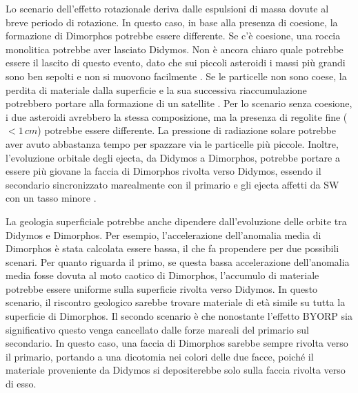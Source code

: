 \documentclass[a4paper,11pt,openright]{book}
\begin{document}
Lo scenario dell'effetto rotazionale deriva dalle espulsioni di massa dovute al breve periodo di rotazione. In questo caso, in base alla presenza di coesione, la formazione di Dimorphos potrebbe essere differente. Se c'è coesione, una roccia monolitica potrebbe aver lasciato Didymos. Non è ancora chiaro quale potrebbe essere il lascito di questo evento, dato che sui piccoli asteroidi i massi più grandi sono ben sepolti e non si muovono facilmente \citep{daly_hemispherical_2020}. Se le particelle non sono coese, la perdita di materiale dalla superficie e la sua successiva riaccumulazione potrebbero portare alla formazione di un satellite \citep{walsh_spin-up_2012}. Per lo scenario senza coesione, i due asteroidi avrebbero la stessa composizione, ma la presenza di regolite fine ($<1\,cm$) potrebbe essere differente. La pressione di radiazione solare potrebbe aver avuto abbastanza tempo per spazzare via le particelle più piccole. Inoltre, l'evoluzione orbitale degli ejecta, da Didymos a Dimorphos, potrebbe portare a essere più giovane la faccia di Dimorphos rivolta verso Didymos, essendo il secondario sincronizzato marealmente con il primario e gli ejecta affetti da SW con un tasso minore \citep{agrusa_excited_2021}.

La geologia superficiale potrebbe anche dipendere dall'evoluzione delle orbite tra Didymos e Dimorphos. Per esempio, l'accelerazione dell'anomalia media di Dimorphos è stata calcolata essere bassa, il che fa propendere per due possibili scenari. Per quanto riguarda il primo, se questa bassa accelerazione dell'anomalia media fosse dovuta al moto caotico di Dimorphos, l'accumulo di materiale potrebbe essere uniforme sulla superficie rivolta verso Didymos. In questo scenario, il riscontro geologico sarebbe trovare materiale di età simile su tutta la superficie di Dimorphos. Il secondo scenario è che nonostante l'effetto BYORP sia significativo questo venga cancellato dalle forze mareali del primario sul secondario. In questo caso, una faccia di Dimorphos sarebbe sempre rivolta verso il primario, portando a una dicotomia nei colori delle due facce, poiché il materiale proveniente da Didymos si depositerebbe solo sulla faccia rivolta verso di esso.
\end{document}
